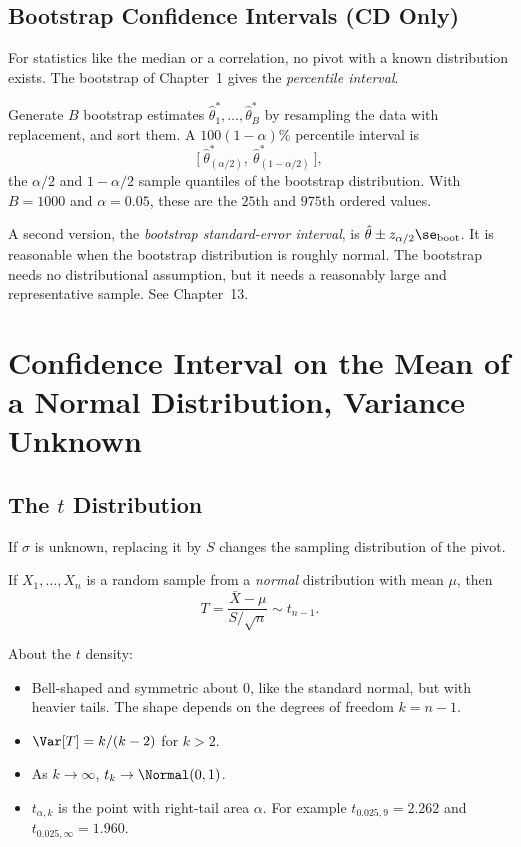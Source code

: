 \subsection{Bootstrap Confidence Intervals (CD Only)}

For statistics like the median or a correlation, no pivot with a known distribution exists. The bootstrap of Chapter~1 gives the \emph{percentile interval}.

\begin{definition}
Generate $B$ bootstrap estimates $\hat\theta^*_1,\dots,\hat\theta^*_B$ by resampling the data with replacement, and sort them. A $100(1-\alpha)\%$ percentile interval is
\[ \big[\ \hat\theta^*_{(\alpha/2)},\ \hat\theta^*_{(1-\alpha/2)}\ \big], \]
the $\alpha/2$ and $1-\alpha/2$ sample quantiles of the bootstrap distribution. With $B=1000$ and $\alpha=0.05$, these are the $25$th and $975$th ordered values.
\end{definition}

A second version, the \emph{bootstrap standard-error interval}, is $\hat\theta\pm z_{\alpha/2}\se_{\mathrm{boot}}$. It is reasonable when the bootstrap distribution is roughly normal. The bootstrap needs no distributional assumption, but it needs a reasonably large and representative sample. See Chapter~13.

\section{Confidence Interval on the Mean of a Normal Distribution, Variance Unknown}

\subsection{The $t$ Distribution}

If $\sigma$ is unknown, replacing it by $S$ changes the sampling distribution of the pivot.

\begin{theorem}\label{thm:t-pivot}
If $X_1,\dots,X_n$ is a random sample from a \emph{normal} distribution with mean $\mu$, then
\[ T=\frac{\bar{X}-\mu}{S/\sqrt n}\sim t_{n-1}. \]
\end{theorem}

About the $t$ density:
\begin{itemize}
  \item Bell-shaped and symmetric about $0$, like the standard normal, but with heavier tails. The shape depends on the degrees of freedom $k=n-1$.
  \item $\Var[T]=k/(k-2)$ for $k>2$.
  \item As $k\to\infty$, $t_k\to\Normal(0,1)$.
  \item $t_{\alpha,k}$ is the point with right-tail area $\alpha$. For example $t_{0.025,9}=2.262$ and $t_{0.025,\infty}=1.960$.
\end{itemize}

